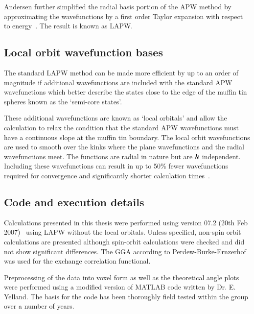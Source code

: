 Andersen further simplified the radial basis portion of the \ac{APW} method by approximating the wavefunctions by a first order Taylor expansion with respect to energy~\cite{Andersen1975}. The result is known as \ac{LAPW}.

\subsection{Local orbit wavefunction bases}

The standard \ac{LAPW} method can be made more efficient by up to an order of magnitude if additional wavefunctions are included with the standard \ac{APW} wavefunctions which better describe the states close to the edge of the muffin tin spheres known as the `semi-core states'.

These additional wavefunctions are known as `local orbitals' and allow the calculation to relax the condition that the standard \ac{APW} wavefunctions must have a continuous slope at the muffin tin boundary. The local orbit wavefunctions are used to smooth over the kinks where the plane wavefunctions and the radial wavefunctions meet. The functions are radial in nature but are $\boldsymbol{k}$ independent. Including these wavefunctions can result in up to \unit{50}{\%} fewer wavefunctions required for convergence and significantly shorter calculation times~\cite{Madsen2001}.

\subsection{Code and execution details}

Calculations presented in this thesis were performed using \WIEN{} version 07.2 (20th Feb 2007)~\cite{Blaha2001} using \ac{LAPW} without the local orbitals. Unless specified, non-spin orbit calculations are presented although spin-orbit calculations were checked and did not show significant differences. The \ac{GGA} according to Perdew-Burke-Ernzerhof~\cite{Perdew1996} was used for the exchange correlation functional.

Preprocessing of the \WIEN{} data into voxel form as well as the theoretical angle plots were performed using a modified version of MATLAB code written by Dr. E. Yelland. The basis for the code has been thoroughly field tested within the group over a number of years.

